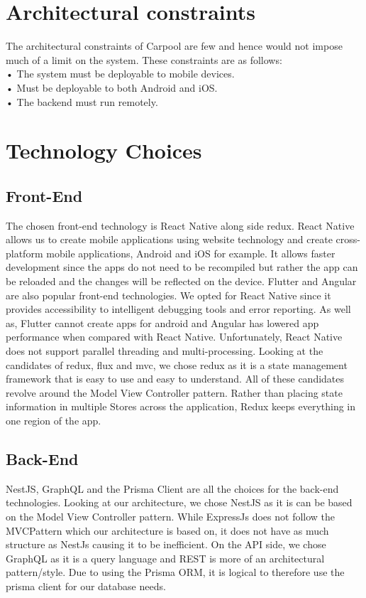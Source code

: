 \documentclass[hidelinks, 12pt, a4paper]{article}
\begin{document}
\newpage
\section{Architectural constraints}
The architectural constraints of Carpool are few and hence would not impose much of a limit on the system. These constraints are as follows:\\
•    The system must be deployable to mobile devices.\\
•    Must be deployable to both Android and iOS.\\
•    The backend must run remotely.\\
\section{Technology Choices}
\subsection{Front-End}
The chosen front-end technology is React Native along side redux.
React Native allows us to create mobile applications using website technology and create cross-platform mobile applications, Android and iOS for example.
It allows faster development since the apps do not need to be recompiled but rather the app can be reloaded and the changes will be reflected on the device.
Flutter and Angular are also popular front-end technologies.
We opted for React Native since it provides accessibility to intelligent debugging tools and error reporting.
As well as, Flutter cannot create apps for android and Angular has lowered app performance when compared with React Native.
Unfortunately, React Native does not support parallel threading and multi-processing.
\newline
\newline
Looking at the candidates of redux, flux and mvc, we chose redux as it is a state management framework that is easy to use and easy to understand.
All of these candidates revolve around the Model View Controller pattern.
Rather than placing state information in multiple Stores across the application, Redux keeps everything in one region of the app.
\subsection{Back-End}
NestJS, GraphQL and the Prisma Client are all the choices for the back-end technologies.
Looking at our architecture, we chose NestJS as it is can be based on the Model View Controller pattern.
While ExpressJs does not follow the MVCPattern which our architecture is based on, it does not have as much structure as NestJs causing it to be inefficient.
On the API side, we chose GraphQL as it is a query language and REST is more of an architectural pattern/style.
Due to using the Prisma ORM, it is logical to therefore use the prisma client for our database needs.
\end{document}

